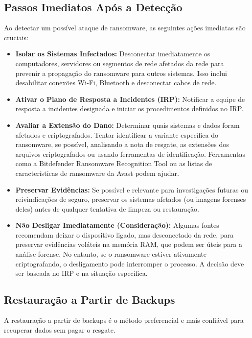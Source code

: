 \subsection{Passos Imediatos Após a Detecção}
Ao detectar um possível ataque de ransomware, as seguintes ações imediatas são cruciais:

\begin{itemize}
    \item \textbf{Isolar os Sistemas Infectados:} Desconectar imediatamente os computadores, servidores ou segmentos de rede afetados da rede para prevenir a propagação do ransomware para outros sistemas. Isso inclui desabilitar conexões Wi-Fi, Bluetooth e desconectar cabos de rede.
    \item \textbf{Ativar o Plano de Resposta a Incidentes (IRP):} Notificar a equipe de resposta a incidentes designada e iniciar os procedimentos definidos no IRP.
    \item \textbf{Avaliar a Extensão do Dano:} Determinar quais sistemas e dados foram afetados e criptografados. Tentar identificar a variante específica do ransomware, se possível, analisando a nota de resgate, as extensões dos arquivos criptografados ou usando ferramentas de identificação. Ferramentas como a Bitdefender Ransomware Recognition Tool ou as listas de características de ransomware da Avast podem ajudar.
    \item \textbf{Preservar Evidências:} Se possível e relevante para investigações futuras ou reivindicações de seguro, preservar os sistemas afetados (ou imagens forenses deles) antes de qualquer tentativa de limpeza ou restauração.
    \item \textbf{Não Desligar Imediatamente (Consideração):} Algumas fontes recomendam deixar o dispositivo ligado, mas desconectado da rede, para preservar evidências voláteis na memória RAM, que podem ser úteis para a análise forense. No entanto, se o ransomware estiver ativamente criptografando, o desligamento pode interromper o processo. A decisão deve ser baseada no IRP e na situação específica.
\end{itemize}

\subsection{Restauração a Partir de Backups}
A restauração a partir de backups é o método preferencial e mais confiável para recuperar dados sem pagar o resgate.

